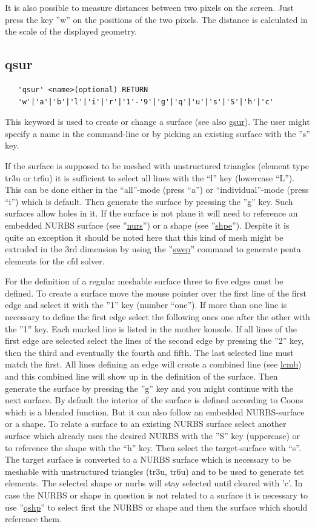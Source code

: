 \documentclass{article}
\providecommand{\htmlref}[2]{\hyperref[#2]{#1}}
\begin{document}
It is also possible to measure distances between two pixels on the screen. Just press the key ''w'' on the positions of the two pixels. The distance is calculated in the scale of the displayed geometry.

\subsection{\label{qsur}qsur}
\begin{verbatim}
   'qsur' <name>(optional) RETURN
   'w'|'a'|'b'|'l'|'i'|'r'|'1'-'9'|'g'|'q'|'u'|'s'|'S'|'h'|'c'
\end{verbatim}
This keyword is used to create or change a surface (see also \htmlref{gsur}{gsur}). The user might specify a name in the command-line or by picking an existing surface with the ''s'' key.

If the surface is supposed to be meshed with unstructured triangles (element type tr3u or tr6u) it is sufficient to select all lines with the ``l'' key (lowercase ``L''). This can be done either in the ``all''-mode (press ``a'') or ``individual''-mode (press ``i'') which is default. Then generate the surface by pressing the ''g'' key. Such surfaces allow holes in it. If the surface is not plane it will need to reference an embedded NURBS surface (see ''\htmlref{nurs}{nurs}'') or a shape (see ''\htmlref{shpe}{shpe}''). Despite it is quite an exception it should be noted here that this kind of mesh might be extruded in the 3rd dimension by using the ''\htmlref{swep}{swep}'' command to generate penta elements for the cfd solver.

For the definition of a regular meshable surface three to five edges must be
defined. To create a surface move the mouse pointer over the first line of the
first edge and select it with the ''1'' key (number ``one''). If more than one
line is necessary to define the first edge select the following ones one after
the other with the ''1'' key. Each marked line is listed in the mother
konsole. If all lines of the first edge are selected select the lines of the
second edge by pressing the ''2'' key, then the third and eventually the
fourth and fifth. The last selected line must match the first. All lines
defining an edge will create a combined line (see \htmlref{lcmb}{lcmb}) and
this combined line will show up in the definition of the surface. Then
generate the surface by pressing the ''g'' key and you might continue with the
next surface. By default the interior of the surface is defined according to
Coons \cite{Coons} which is a blended function. But it can also follow an
embedded NURBS-surface or a shape. To relate a surface to an existing NURBS
surface select another surface which already uses the desired NURBS with the
''S'' key (uppercase) or to reference the shape with the ``h'' key. Then
select the target-surface with ``s''. The target surface is converted to a
NURBS surface which is necessary to be meshable with unstructured triangles
(tr3u, tr6u) and to be used to generate tet elements. The selected shape or nurbs will stay selected until cleared with 'c'. In case the NURBS or shape in question is not related to a surface it is necessary to use ''\htmlref{qshp}{qshp}'' to select first the NURBS or shape and then the surface which should reference them.  
\end{document}
